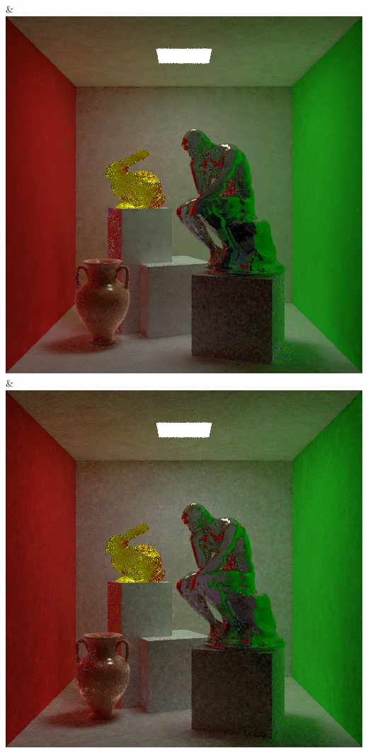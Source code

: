 & \includegraphics[width=\linewidth]{figures/py/tests/sppc_optimization/nrc+sppc16@1_1spp_thinker.png}
& \includegraphics[width=\linewidth]{figures/py/tests/sppc_optimization/nrc+sppc16@4_1spp_thinker.png}
